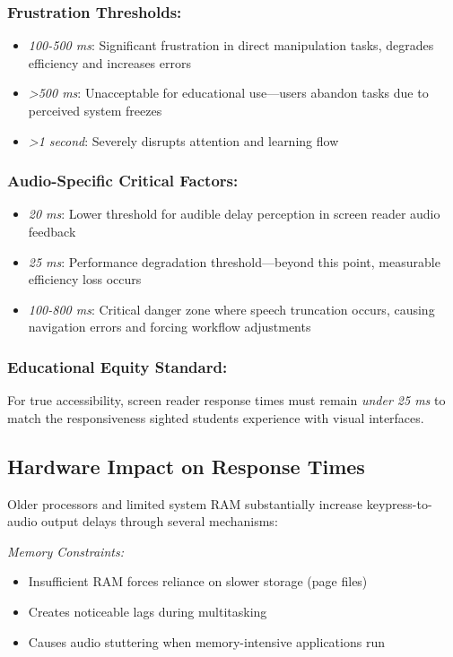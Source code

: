 \subsubsection{Frustration Thresholds:}
\begin{itemize}
    \item \emph{100-500 ms}: Significant frustration in direct manipulation tasks, degrades efficiency and increases errors
    \item \emph{>500 ms}: Unacceptable for educational use—users abandon tasks due to perceived system freezes
    \item \emph{>1 second}: Severely disrupts attention and learning flow
\end{itemize}

\subsubsection{Audio-Specific Critical Factors:}
\begin{itemize}
    \item \emph{20 ms}: Lower threshold for audible delay perception in screen reader audio feedback
    \item \emph{25 ms}: Performance degradation threshold—beyond this point, measurable efficiency loss occurs
    \item \emph{100-800 ms}: Critical danger zone where speech truncation occurs, causing navigation errors and forcing workflow adjustments
\end{itemize}

\subsubsection{Educational Equity Standard:}
For true accessibility, screen reader response times must remain \emph{under 25 ms} to match the responsiveness sighted students experience with visual interfaces.

\subsection{Hardware Impact on Response Times}\label{hardware-impact-on-response-times}

Older processors and limited system RAM substantially increase keypress-to-audio output delays through several mechanisms:

\emph{Memory Constraints:}
\begin{itemize}
    \item Insufficient RAM forces reliance on slower storage (page files)
    \item Creates noticeable lags during multitasking
    \item Causes audio stuttering when memory-intensive applications run
\end{itemize}


